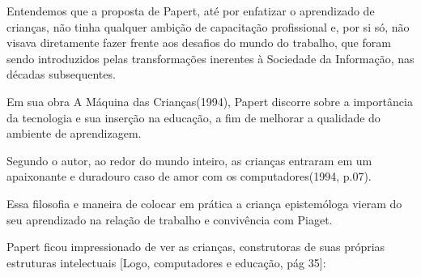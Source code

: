 \documentclass[
12pt,		%
openright,	%
twoside,  %
a4paper,			%
chapter=TITLE,		%
english,			%
french,				%
spanish,			%
brazil				%
]{USPSC-classe/USPSC}
\begin{document}
Entendemos que a proposta de Papert, at\'e por enfatizar o aprendizado de crian\c{c}as, n\~ao tinha qualquer ambi\c{c}\~ao de capacita\c{c}\~ao profissional e, por si s\'o, n\~ao visava diretamente fazer frente aos desafios do \textquotedbl mundo do trabalho\textquotedbl , que foram sendo introduzidos pelas transforma\c{c}\~oes inerentes \`a Sociedade da Informa\c{c}\~ao, nas d\'ecadas subsequentes.









Em sua obra \textquotedbl A M\'aquina das Crian\c{c}as\textquotedbl  (1994), Papert discorre sobre a import\^ancia da tecnologia e sua inser\c{c}\~ao na educa\c{c}\~ao, a fim de melhorar a qualidade do ambiente de aprendizagem.










\noindent\begin{center}\mbox{\centering{}}\end{center}


Segundo o autor, \textquotedbl ao redor do mundo inteiro, as crian\c{c}as entraram em um apaixonante e duradouro caso de amor com os computadores\textquotedbl  (1994, p.07).









Essa filosofia e maneira de colocar em pr\'atica a crian\c{c}a epistem\'ologa vieram do seu aprendizado na rela\c{c}\~ao de trabalho e conviv\^encia com Piaget.









Papert ficou impressionado de ver as crian\c{c}as, construtoras de suas pr\'oprias estruturas intelectuais [Logo, computadores e educa\c{c}\~ao, p\'ag 35]:
\end{document}
